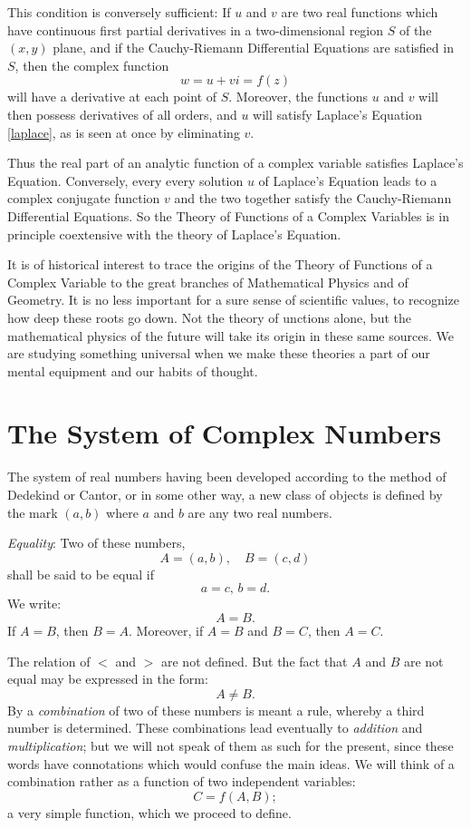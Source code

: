 \documentclass[letter,oneside]{memoir}
\begin{document}
This condition is conversely sufficient: If $u$ and $v$ are two real functions which have continuous first partial derivatives in a two-dimensional region $S$ of the $(x,y)$ plane, and if the Cauchy-Riemann Differential Equations are satisfied in $S$, then the complex function
\[
	w=u+vi=f(z)
\] will have a derivative at each point of $S$. Moreover, the functions $u$ and $v$ will then possess derivatives of all orders, and $u$ will satisfy Laplace's Equation \ref{laplace}, as is seen at once by eliminating $v$. 

Thus the real part of an analytic function of a complex variable satisfies Laplace's Equation. Conversely, every every solution $u$ of Laplace's Equation leads to a complex conjugate function $v$ and the two together satisfy the Cauchy-Riemann Differential Equations. So the Theory of Functions of a Complex Variables is in principle coextensive with the theory of Laplace's Equation. 

It is of historical interest to trace the origins of the Theory of Functions of a Complex Variable to the great branches of Mathematical Physics and of Geometry. It is no less important for a sure sense of scientific values, to recognize how deep these roots go down. Not the theory of unctions alone, but the mathematical physics of the future will take its origin in these same sources. We are studying something universal when we make these theories a part of our mental equipment and our habits of thought. 

\section{The System of Complex Numbers}

The system of real numbers having been developed according to the method of Dedekind or Cantor, or in some other way, a new class of objects is defined by the mark $(a,b)$ where $a$ and $b$ are any two real numbers. 

\emph{Equality}: Two of these numbers,
\[
	A=(a,b), \quad B=(c,d)
\] shall be said to be equal if
\[
a=c, \, b=d
.\] We write:
\[
A=B
.\] If $A=B$, then $B=A$. Moreover, if $A=B$ and $B=C$, then $A=C$.

The relation of $<$ and $>$ are not defined. But the fact that $A$ and $B$ are not equal may be expressed in the form:
\[
A\neq B
.\] By a \emph{combination} of two of these numbers is meant a rule, whereby a third number is determined. These combinations lead eventually to \emph{addition} and \emph{multiplication}; but we will not speak of them as such for the present, since these words have connotations which would confuse the main ideas. We will think of a combination rather as a function of two independent variables:
\[
	C=f(A,B)
;\] a very simple function, which we proceed to define. 
\end{document}
